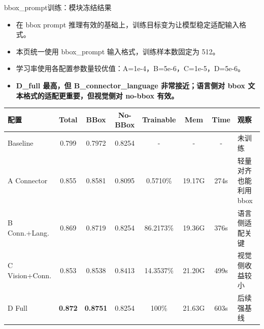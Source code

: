 \documentclass{beamer}
\begin{document}
\begin{frame}[shrink=6]{bbox\_prompt训练：模块冻结结果}
\small
\begin{itemize}
\item 在 bbox prompt 推理有效的基础上，训练目标变为让模型稳定适配输入格式。
\item 本页统一使用 bbox\_prompt 输入格式，训练样本数固定为 512。
\item 学习率使用各配置参数量较优值：A=1e-4，B=5e-6，C=1e-5，D=5e-6。
\item \textbf{D\_full 最高，但 B\_connector\_language 非常接近；语言侧对 bbox 文本格式的适配更重要，但视觉侧对 no-bbox 有效。}
\end{itemize}
\centering  %
\begin{tabular}{lccccccp{}}
\toprule
配置 & Total & BBox & No-BBox & Trainable & Mem & Time & 观察 \\
\midrule
Baseline & 0.799 & 0.7972 & 0.8254 & - & - & - & 未训练 \\
A Connector & 0.855 & 0.8581 & 0.8095 & 0.5710\% & 19.17G & 274s & 轻量对齐也能利用 bbox \\
B Conn.+Lang. & 0.869 & 0.8719 & 0.8254 & 86.2173\% & 19.36G & 376s & 语言侧适配关键 \\
C Vision+Conn. & 0.853 & 0.8538 & 0.8413 & 14.3537\% & 21.20G & 499s & 视觉侧收益较小 \\
D Full & \textbf{0.872} & \textbf{0.8751} & 0.8254 & 100\% & 21.63G & 603s & 后续强基线 \\
\bottomrule
\end{tabular}
\vspace{0.3em}
\end{frame}
\end{document}
